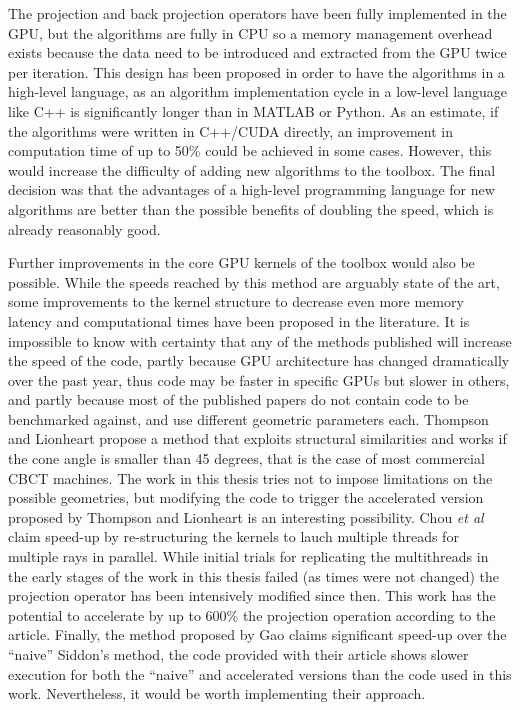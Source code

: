 The projection and back projection operators have been fully implemented in the GPU, but the algorithms are fully in CPU so a memory management overhead exists because the data need to be introduced and extracted from the GPU twice per iteration. This design has been proposed in order to have the algorithms in a high-level language, as an algorithm implementation cycle in a low-level language like C++ is significantly longer than in MATLAB or Python. As an estimate, if the algorithms were written in C++/CUDA directly, an improvement in computation time of up to 50\% could be achieved in some cases. However, this would increase the difficulty of adding new algorithms to the toolbox. The final decision was that the advantages of a high-level programming language for new algorithms are better than the possible benefits of doubling the speed, which is already reasonably good. 

Further improvements in the core GPU kernels of the toolbox would also be possible. While the speeds reached by this method are arguably state of the art, some improvements to the kernel structure to decrease even more memory latency and computational times have been proposed in the literature. It is impossible to know with certainty that any of the methods published will increase the speed of the code, partly because GPU architecture has changed dramatically over the past year, thus code may be faster in specific GPUs but slower in others, and partly because most of the published papers do not contain code to be benchmarked against, and use different geometric parameters each. Thompson and Lionheart\cite{thompson2014gpu} propose a method that exploits structural similarities and works if the cone angle is smaller than 45 degrees, that is the case of most commercial CBCT machines. The work in this thesis tries not to impose limitations on the possible geometries, but modifying the code to trigger the accelerated version proposed by Thompson and Lionheart is an interesting possibility. Chou \emph{et al}\cite{chou2011fast} claim speed-up by re-structuring the kernels to lauch multiple threads for multiple rays in parallel. While initial trials for replicating the multithreads in the early stages of the work in this thesis failed (as times were not changed) the projection operator has  been intensively modified since then. This work has the potential to accelerate by up to 600\% the projection operation according to the article. Finally, the method proposed by Gao\cite{gao2012fast} claims significant speed-up over the ``naive'' Siddon's method, the code provided with their article shows slower execution for both the ``naive'' and accelerated versions than the code used in this work. Nevertheless, it would be worth implementing their approach.

